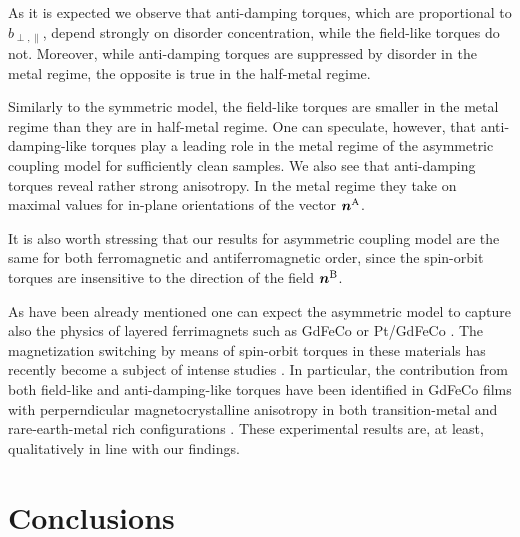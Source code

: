 As it is expected we observe that anti-damping torques, which are proportional to $b_{\perp,\parallel}$, depend strongly on disorder concentration, while the field-like torques do not. Moreover, while anti-damping torques are suppressed by disorder in the metal regime, the opposite is true in the half-metal regime. 

Similarly to the symmetric model, the field-like torques are smaller in the metal regime than they are in half-metal regime. One can speculate, however, that anti-damping-like torques play a leading role in the metal regime of the asymmetric coupling model for sufficiently clean samples. We also see that anti-damping torques reveal rather strong anisotropy. In the metal regime they take on maximal values for in-plane orientations of the vector $\boldsymbol{n}^\textrm{A}$. 
 
It is also worth stressing that our results for asymmetric coupling model are the same for both ferromagnetic and antiferromagnetic order, since the spin-orbit torques are insensitive to the direction of the field $\boldsymbol{n}^\textrm{B}$.  

As have been already mentioned one can expect the asymmetric model to capture also the physics of layered ferrimagnets such as GdFeCo or Pt/GdFeCo \cite{Hoffman2018, KimFERRISOT018}. The magnetization switching by means of spin-orbit torques in these materials has recently become a subject of intense studies 
\cite{Roschewsky2016, Roschewsky2017, KimFERRISOT018}.  In particular, the contribution from both field-like and anti-damping-like torques have been identified in GdFeCo films with perperndicular magnetocrystalline anisotropy in both transition-metal and rare-earth-metal rich configurations \cite{Roschewsky2016, Roschewsky2017}. 
These experimental results are, at least, qualitatively in line with our findings. 

\section{Conclusions}
 
